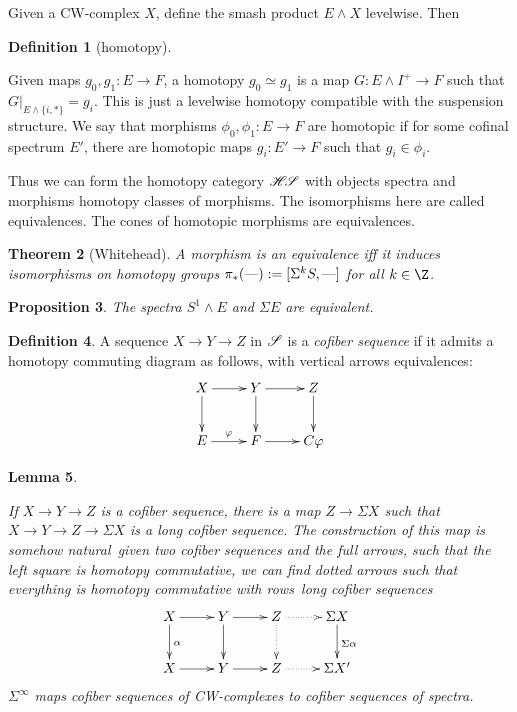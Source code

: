 \documentclass[11pt]{article}
\theoremstyle{plain}
\newtheorem{thm}{Theorem}[subsection]
\newtheorem{lem}[thm]{Lemma}
\newtheorem{prop}[thm]{Proposition}
\theoremstyle{definition}
\newtheorem{defn}[thm]{Definition}
\newcommand{\HS}{\scrH\!\scrS}
\begin{document}
{Given a CW-complex $X$, define the smash product $E\wedge X$ levelwise. Then
\begin{defn}[homotopy]\hfil
\begin{itemise}
\itm[(a)] Given maps $g_0,g_1:E\to F$, a homotopy $g_0\simeq g_1$ is a map
$G:E\wedge I^+\to F$ such that $G|_{E\wedge\{i,*\}}=g_i$. This is just a 
levelwise homotopy compatible with the suspension structure.
\itm[(b)] We say that morphisms $\phi_0,\phi_1:E\to F$ are homotopic if for some
cofinal spectrum $E'$, there are homotopic maps $g_i:E'\to F$ such that
$g_i\in\phi_i$.
\end{itemise}
\end{defn}
\noindent Thus we can form the homotopy category $\HS$ with objects spectra and
morphisms homotopy classes of morphisms. The isomorphisms here are called
equivalences. The cones of homotopic morphisms are equivalences.
\begin{thm}[Whitehead]
A morphism is an equivalence iff it induces isomorphisms on homotopy groups 
$\pi_*(\textup{---}):=[\Sigma^kS,\textup{---}]$ for all $k\in\Z$.
\end{thm}
\begin{prop}
The spectra $S^1\wedge E$ and $\Sigma E$ are equivalent.
\end{prop}
\begin{defn} 
A sequence $X\to Y\to Z$ in $\mathscr{S}$ is a \emph{cofiber sequence} if it admits a
homotopy commuting diagram as follows, with vertical arrows equivalences:
\[\xymatrix{
X\ar[r]\ar[d]&Y\ar[r]\ar[d]&Z\ar[d]\\
E\ar[r]^\phi&F\ar[r]&C\phi
}\]
\end{defn}
\begin{lem}\hfil
\begin{itemise}
\itm[(i)]If $X\to Y\to Z$ is a cofiber sequence, there is a map $Z\to \Sigma X$
such that $X\to Y\to Z\to \Sigma X$ is a long cofiber sequence.
\itm[(ii)]The construction of this map is somehow natural\upcol\ given two
cofiber sequences and the full arrows, such that the left square is homotopy
commutative, we can find dotted arrows such that everything is homotopy
commutative \lparen with rows\ long cofiber sequences\rparen\upcol
\[\xymatrix{
X\ar[r]\ar[d]^\alpha&
Y\ar[r]\ar[d]&Z\ar@{.>}[d]\ar@{.>}[r]&
\Sigma X\ar[d]^{\Sigma\alpha}\\
X\ar[r]&Y\ar[r]&Z\ar@{.>}[r]&\Sigma X'
}\]
\itm[(iii)]$\Sigma^\infty$ maps cofiber sequences of CW-complexes to cofiber
sequences of spectra.
\end{itemise}
\end{lem}
}
\end{document}
